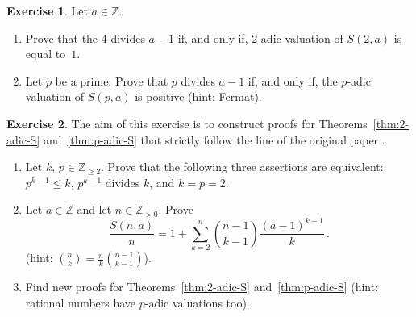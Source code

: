 \documentclass[12pt]{article}
\newcommand{\bZ}{\mathbb{Z}}
\newcommand{\bN}{\bZ_{\ge 0}}%
\newcommand{\bNast}{ \bZ_{> 0}} %
\newcommand{\bNdeux}{\bZ_{\ge 2}}
\theoremstyle{definition}
\newtheorem{exercise}{Exercise}
\begin{document}
\begin{exercise}
 Let $a \in \bZ$.
  \begin{enumerate}
  \item Prove that the $4$ divides $a - 1$ if, and only if, $2$-adic valuation of $S(2, a)$ is equal to~$1$. 
  \item Let $p$ be a prime.
    Prove that $p$ divides $a - 1$ if, and only if, the $p$-adic valuation of $S(p, a)$ is positive (hint: Fermat).
  \end{enumerate}
\end{exercise}



\begin{exercise}
  The aim of this exercise is to construct proofs for Theorems~\ref{thm:2-adic-S} and~\ref{thm:p-adic-S}
  that strictly follow the line of the original paper \cite{HullDobell62}.
  \begin{enumerate}
  \item Let $k$, $p \in \bNdeux$.
    Prove that the following three assertions are equivalent:
    $p^{k - 1} \le k$, $p^{k - 1}$ divides $k$, and $k = p = 2$. 
  \item Let $a \in \bZ$ and let $n \in \bNast$.
    Prove
   $$
  \frac{S(n, a)}{n}  = 1 + \sum_{k = 2}^n \binom{n - 1}{k - 1} \frac{{(a - 1)}^{k - 1}}{k} \, . 
  $$
  (hint: $\binom{n}{k} = \frac{n}{k} \binom{n - 1}{k - 1}$).
\item Find new proofs for Theorems~\ref{thm:2-adic-S} and~\ref{thm:p-adic-S}
  (hint: rational numbers have $p$-adic valuations too).
  \end{enumerate}
\end{exercise}



\end{document}
